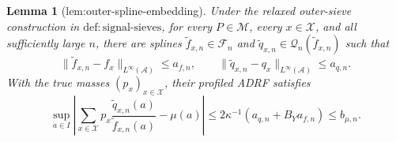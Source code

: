 \documentclass{article}
\newtheorem{lemma}{Lemma}
\begin{document}
\begin{lemma}[lem:outer-spline-embedding]\label{lem:outer-spline-embedding}
Under the relaxed outer-sieve construction in \(\mathrm{def{:}signal\text{-}sieves}\), for every \(P\in\mathcal M\), every \(x\in\mathcal X\), and all sufficiently large \(n\), there are splines \(\widetilde f_{x,n}\in\mathscr F_n\) and \(\widetilde q_{x,n}\in\mathscr Q_n(\widetilde f_{x,n})\) such that
\[
 \|\widetilde f_{x,n}-f_x\|_{L^\infty(\mathcal A)}\le a_{f,n},
 \qquad
 \|\widetilde q_{x,n}-q_x\|_{L^\infty(\mathcal A)}\le a_{q,n}.
\]
With the true masses \((p_x)_{x\in\mathcal X}\), their profiled ADRF satisfies
\[
 \sup_{a\in I}\left|
 \sum_{x\in\mathcal X}p_x\frac{\widetilde q_{x,n}(a)}{\widetilde f_{x,n}(a)}-\mu(a)
 \right|
 \le 2\kappa^{-1}(a_{q,n}+B_Ya_{f,n})
 \le b_{\mu,n}.
\]
\end{lemma}
\end{document}
